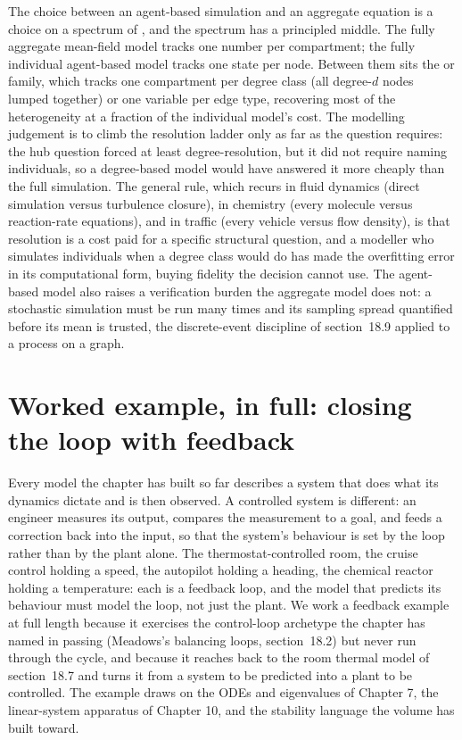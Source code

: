 \begin{mastery}
The choice between an agent-based simulation and an aggregate equation is a
choice on a spectrum of , and the spectrum has a
principled middle. The fully aggregate mean-field model tracks one number
per compartment; the fully individual agent-based model tracks one state
per node. Between them sits the  or
 family, which tracks one compartment per
degree class (all degree-$d$ nodes lumped together) or one variable per
edge type, recovering most of the heterogeneity at a fraction of the
individual model's cost. The modelling judgement is to climb the resolution
ladder only as far as the question requires: the hub question forced at
least degree-resolution, but it did not require naming individuals, so a
degree-based model would have answered it more cheaply than the full
simulation. The general rule, which recurs in fluid dynamics (direct
simulation versus turbulence closure), in chemistry (every molecule versus
reaction-rate equations), and in traffic (every vehicle versus flow
density), is that resolution is a cost paid for a specific structural
question, and a modeller who simulates individuals when a degree class
would do has made the overfitting error in its computational form, buying
fidelity the decision cannot use. The agent-based model also raises a
verification burden the aggregate model does not: a stochastic simulation
must be run many times and its sampling spread quantified before its mean
is trusted, the discrete-event discipline of section~18.9 applied to a
process on a graph.
\end{mastery}

\section{Worked example, in full: closing the loop with feedback}

Every model the chapter has built so far describes a system that does what
its dynamics dictate and is then observed. A controlled system is
different: an engineer measures its output, compares the measurement to a
goal, and feeds a correction back into the input, so that the system's
behaviour is set by the loop rather than by the plant alone. The
thermostat-controlled room, the cruise control holding a speed, the
autopilot holding a heading, the chemical reactor holding a temperature:
each is a feedback loop, and the model that predicts its behaviour must
model the loop, not just the plant. We work a feedback example at full
length because it exercises the control-loop archetype the chapter has
named in passing (Meadows's balancing loops, section~18.2) but never run
through the cycle, and because it reaches back to the room thermal model of
section~18.7 and turns it from a system to be predicted into a plant to be
controlled. The example draws on the ODEs and eigenvalues of Chapter 7, the
linear-system apparatus of Chapter 10, and the stability language the
volume has built toward.

